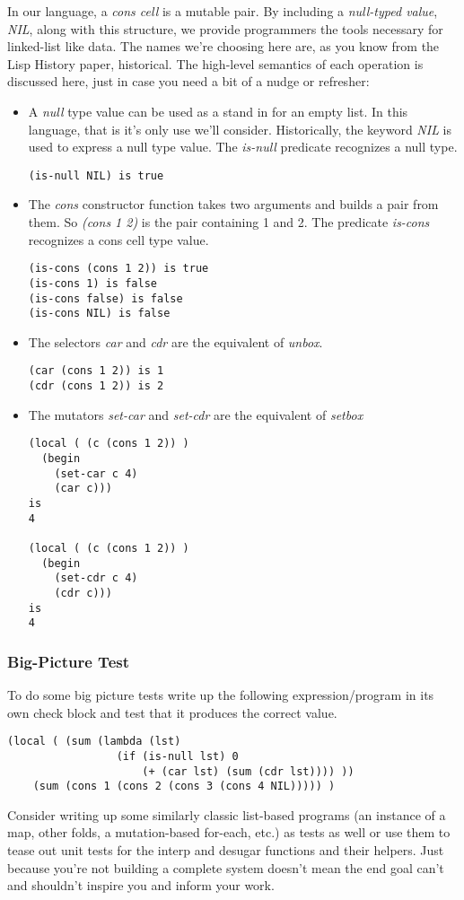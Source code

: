 \documentclass[10pt]{article}
\begin{document}
In our language, a \textit{cons cell} is a mutable pair. By including a \textit{null-typed value}, \textit{NIL}, along with this structure, we provide programmers the tools necessary for linked-list like data. The names we're choosing here are, as you know from the Lisp History paper, historical. The high-level semantics of each operation is discussed here, just in case you need a bit of a nudge or refresher:
\begin{itemize}
\item A \textit{null} type value can be used as a stand in for an empty list. In this language, that is it's only use we'll consider.  Historically, the keyword \textit{NIL} is used to express a null type value. The \textit{is-null} predicate recognizes a null type.
\begin{verbatim}
(is-null NIL) is true
\end{verbatim}
\item The \textit{cons} constructor function takes two arguments and builds a pair from them. So \textit{(cons 1 2)} is the pair containing 1 and 2. The predicate \textit{is-cons} recognizes a cons cell type value.
\begin{verbatim}
(is-cons (cons 1 2)) is true
(is-cons 1) is false
(is-cons false) is false
(is-cons NIL) is false
\end{verbatim}
\item The selectors \textit{car} and \textit{cdr} are the equivalent of \textit{unbox}. 
\begin{verbatim}
(car (cons 1 2)) is 1
(cdr (cons 1 2)) is 2
\end{verbatim}
\item The mutators \textit{set-car} and \textit{set-cdr} are the equivalent of \textit{setbox}
\begin{verbatim}
(local ( (c (cons 1 2)) )
  (begin 
    (set-car c 4)
    (car c)))  
is
4 

(local ( (c (cons 1 2)) )
  (begin 
    (set-cdr c 4)
    (cdr c)))  
is
4 
\end{verbatim}
\end{itemize}

\subsubsection*{Big-Picture Test}

To do some big picture tests write up the following expression/program in its own check block
and test that it produces the correct value. 
\begin{verbatim}
(local ( (sum (lambda (lst) 
                 (if (is-null lst) 0
                     (+ (car lst) (sum (cdr lst)))) ))
    (sum (cons 1 (cons 2 (cons 3 (cons 4 NIL))))) )
\end{verbatim}
Consider writing up some similarly classic list-based programs (an instance of a map, other folds, a mutation-based for-each, etc.) as tests as well or use them to tease out unit tests for the interp and desugar functions and their helpers. Just because you're not building a complete system doesn't mean the end goal can't and shouldn't inspire you and inform your work.
\end{document}
